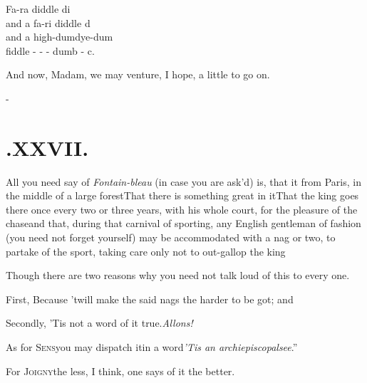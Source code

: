 \documentclass{article}
\begin{document}
Fa-ra diddle di\\\indent
and a fa-ri diddle d\\\indent
and a high-dum\tsk dye-dum\\\indent
\quad fiddle - - - dumb - c.

\noindent
And now, Madam, we may venture, I hope, a little to go on.

\vfill{}\eject
\null\kern-\baselineskip
\section{.\enspace XXVII.}

\quad\tsh All you need say of \textit{Fontain-\break bleau} (in case you are ask’d)
is, that it\break{}\break
from Paris, in the middle of a large\break
forest\tsh That there is something great in it\tsh That the king goes
there once every two or three years, with his whole court, for the pleasure of the
chase\tsk and that, during that carnival of sporting, any English gentleman of fashion
(you need not forget yourself) may be accommodated with a nag or two, to partake of
the sport, taking care only not to out-gallop the king\tsh

Though there are two reasons why you need not talk loud of this
to every one.

First, Because ’twill make the said nags the harder to be
got; and

Secondly, ’Tis not a word of it
true.\break\tsh \textit{Allons!}

As for \textsc{Sens}\tsh you may
dispatch it\break in a word\tsh \lqq\textit{’Tis an
archiepiscopal\break see}.”

\tsh For \textsc{Joigny}\tsk the less, I think,\break
one says of it the better.
\end{document}
